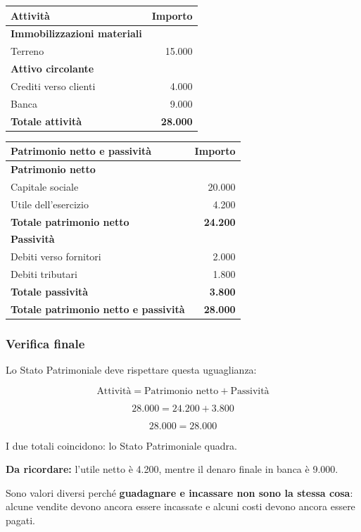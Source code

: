 \begin{center}
    \begin{tabular}{|l|r|}
        \hline
        \textbf{Attività} & \textbf{Importo} \\
        \hline
        \textbf{Immobilizzazioni materiali} & \\
        Terreno & 15.000 \\
        \hline
        \textbf{Attivo circolante} & \\
        Crediti verso clienti & 4.000 \\
        Banca & 9.000 \\
        \hline
        \textbf{Totale attività} & \textbf{28.000} \\
        \hline
    \end{tabular}
\end{center}

\begin{center}
    \begin{tabular}{|l|r|}
        \hline
        \textbf{Patrimonio netto e passività}
        & \textbf{Importo} \\
        \hline
        \textbf{Patrimonio netto} & \\
        Capitale sociale & 20.000 \\
        Utile dell'esercizio & 4.200 \\
        \textbf{Totale patrimonio netto} & \textbf{24.200} \\
        \hline
        \textbf{Passività} & \\
        Debiti verso fornitori & 2.000 \\
        Debiti tributari & 1.800 \\
        \textbf{Totale passività} & \textbf{3.800} \\
        \hline
        \textbf{Totale patrimonio netto e passività}
        & \textbf{28.000} \\
        \hline
    \end{tabular}
\end{center}

\subsubsection*{Verifica finale}

\noindent Lo Stato Patrimoniale deve rispettare
questa uguaglianza:

\[
\text{Attività}
=
\text{Patrimonio netto}+\text{Passività}
\]

\[
28.000=24.200+3.800
\]

\[
\boxed{28.000=28.000}
\]

\noindent I due totali coincidono:
lo Stato Patrimoniale quadra.

\medskip

\noindent \textbf{Da ricordare:}
l'utile netto è 4.200, mentre il denaro finale
in banca è 9.000.

\noindent Sono valori diversi perché
\textbf{guadagnare e incassare non sono la stessa cosa}:
alcune vendite devono ancora essere incassate
e alcuni costi devono ancora essere pagati.
\newpage